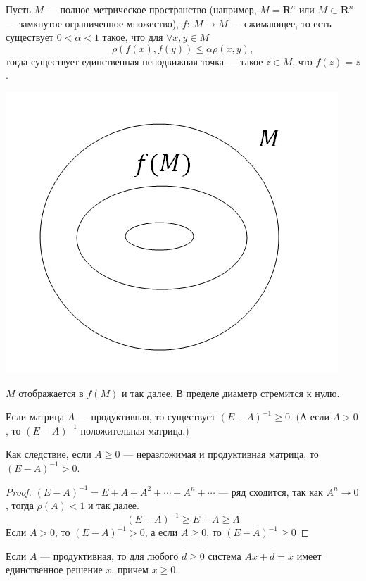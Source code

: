 \begin{theorem}
    Пусть $M$ --- полное метрическое пространство (например, $M=\textbf{R}^n$ или $M \subset \textbf{R}^n$ --- замкнутое ограниченное множество), $f:~M\to M$ --- сжимающее, то есть существует $0<\alpha <1$ такое, что для $\forall x, y \in M$
$$\rho(f(x), f(y))\leqslant \alpha \rho(x, y),$$
тогда существует единственная неподвижная точка --- такое $z\in M$, что $f(z)=z$.\\
\begin{center}
    \includegraphics[scale=0.7]{l14_1.png}\\
\end{center}
$M$ отображается в $f(M)$ и так далее. В пределе диаметр стремится к нулю.
\end{theorem}
\begin{lemma}
    Если матрица $A$ --- продуктивная, то существует $(E-A)^{-1}\geqslant 0$. (А если $A>0$, то $(E-A)^{-1}$ положительная матрица.)
    
    Как следствие, если $A\geqslant 0$ --- неразложимая и продуктивная матрица, то $(E-A)^{-1}>0$.
\end{lemma}
\begin{proof}
    $(E-A)^{-1}=E+A+A^2+\cdots +A^n+\cdots$ --- ряд сходится, так как $A^n \to 0$, тогда $\rho(A)<1$ и так далее.\\
$$(E-A)^{-1}\geqslant E+A \geqslant A$$
Если $A>0$, то $(E-A)^{-1}>0$, а если $A\geqslant 0$, то $(E-A)^{-1}\geqslant 0$
\end{proof}
\begin{theorem}
    Если $A$ --- продуктивная, то для любого $\bar d \geqslant \bar 0$ система $A\bar x+\bar d=\bar x$ имеет единственное решение $\bar x$, причем $\bar x \geqslant 0$.
\end{theorem}
